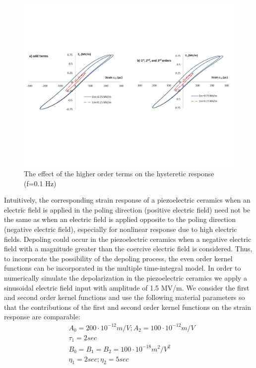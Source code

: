 \begin{figure}
\centering
\includegraphics[width=6.0in]
{./chap_3_minor_loop/figures/figure_3_8_the_effect_of_the_higher_order_terms_on_the_hysteretic_response.pdf}
\caption{The effect of the higher order terms on the hysteretic response (f=0.1 Hz)}
\label{figure_3_8_the_effect_of_the_higher_order_terms_on_the_hysteretic_response}
\end{figure}

Intuitively, the corresponding strain response of a piezoelectric ceramics when an electric
field is applied in the poling direction (positive electric field) need not be the same as when
an electric field is applied opposite to the poling direction (negative electric field), especially
for nonlinear response due to high electric fields. Depoling could occur in the piezoelectric
ceramics when a negative electric field with a magnitude greater than the coercive electric
field is considered. Thus, to incorporate the possibility of the depoling process, the even
order kernel functions can be incorporated in the multiple time-integral model.  In order to
numerically simulate the depolarization in the piezoelectric ceramics we apply a sinusoidal
electric field input with amplitude of 1.5 MV/m. We consider the first and second order
kernel functions and use the following material parameters so that the contributions of the
first and second order kernel functions on the strain response are comparable:
\begin{equation}
\begin{aligned}
&A_0=200 \cdot 10^{-12} m/V; A_2=100 \cdot 10^{-12} m/V \\
&\tau_1=2 sec \\
&B_0=B_1=B_2=100 \cdot 10^{-18} m^2/V^2 \\
&\eta_1=2sec; \eta_2=5 sec  
\end{aligned}
\label{3_5_EQN:coefficients_}
\end{equation}

